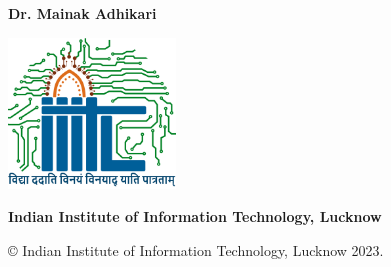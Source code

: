 \begin{center}
    {\bf{Dr. Mainak Adhikari}}


    \vspace{1.3cm}

    \includegraphics[height=4cm]{./Images/Logo_IIITL.png}

    {\bf\large{Indian Institute of Information Technology, Lucknow}}\\
    {\bf{}}
\end{center}

\medskip

\centerline{ \copyright{} Indian Institute of Information Technology, Lucknow 2023.}

\cleardoublepage






